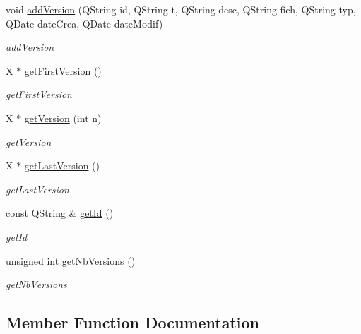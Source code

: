 \begin{DoxyCompactItemize}
void \hyperlink{class_histo_notes_a0f741ee9bf04a58e79b5ba5b195cc0a4}{add\+Version} (Q\+String id, Q\+String t, Q\+String desc, Q\+String fich, Q\+String typ, Q\+Date date\+Crea, Q\+Date date\+Modif)
\begin{DoxyCompactList}\small\item\em add\+Version \end{DoxyCompactList}\item 
X $\ast$ \hyperlink{class_histo_notes_abe903cffbb7e55bf789c2b6da6186560}{get\+First\+Version} ()
\begin{DoxyCompactList}\small\item\em get\+First\+Version \end{DoxyCompactList}\item 
X $\ast$ \hyperlink{class_histo_notes_a08df51f5f3ce7f4b275b0295b43ef75d}{get\+Version} (int n)
\begin{DoxyCompactList}\small\item\em get\+Version \end{DoxyCompactList}\item 
X $\ast$ \hyperlink{class_histo_notes_adb66fa74f80e761f52889d67327e2c4f}{get\+Last\+Version} ()
\begin{DoxyCompactList}\small\item\em get\+Last\+Version \end{DoxyCompactList}\item 
const Q\+String \& \hyperlink{class_histo_notes_ad63d626540a8ef0f59cd2019dd351e38}{get\+Id} ()
\begin{DoxyCompactList}\small\item\em get\+Id \end{DoxyCompactList}\item 
unsigned int \hyperlink{class_histo_notes_acfc34a454bc439ac6d1c282932667e1f}{get\+Nb\+Versions} ()
\begin{DoxyCompactList}\small\item\em get\+Nb\+Versions \end{DoxyCompactList}\end{DoxyCompactItemize}


\subsection{Member Function Documentation}
\mbox{\label{class_histo_notes_a3c173ff3cbc3c69db0f5ebd0449e7f63}} 
